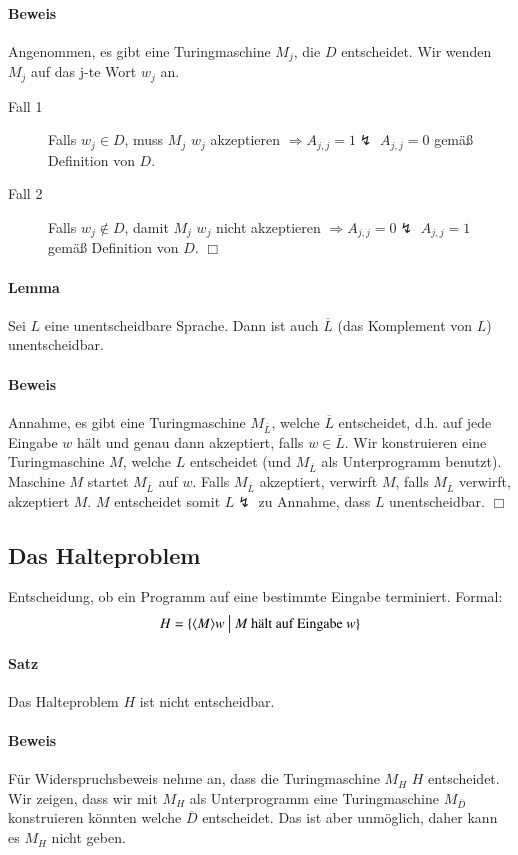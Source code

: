 \paragraph*{Beweis} Angenommen, es gibt eine Turingmaschine $M_j$, die $D$ entscheidet. Wir wenden $M_j$ auf das j-te Wort $w_j$ an.
\begin{description}
	\item[Fall 1] Falls $w_j \in D$, muss $M_j$ $w_j$ akzeptieren $\Rightarrow A_{j,j}=1 \lightning$ $A_{j,j}=0$ gemäß Definition von $D$.
	\item[Fall 2] Falls $w_j \not\in D$, damit $M_j$ $w_j$ nicht akzeptieren $\Rightarrow A_{j,j}=0 \lightning$ $A_{j,j}=1$ gemäß Definition von $D$. $\Box$
\end{description}

\paragraph*{Lemma} Sei $L$ eine unentscheidbare Sprache. Dann ist auch $\overline{L}$ (das Komplement von $L$) unentscheidbar.

\paragraph*{Beweis} Annahme, es gibt eine Turingmaschine $M_{\overline{L}}$, welche $\overline{L}$ entscheidet, d.h. auf jede Eingabe $w$ hält und genau dann akzeptiert, falls $w \in \overline{L}$. Wir konstruieren eine Turingmaschine $M$, welche $L$ entscheidet (und $M_{\overline{L}}$ als Unterprogramm benutzt). Maschine $M$ startet $M_{\overline{L}}$ auf $w$. Falls $M_{\overline{L}}$ akzeptiert, verwirft $M$, falls $M_{\overline{L}}$ verwirft, akzeptiert $M$. $M$ entscheidet somit $L \lightning$ zu Annahme, dass $L$ unentscheidbar. $\Box$


\subsection{Das Halteproblem}
Entscheidung, ob ein Programm auf eine bestimmte Eingabe terminiert. Formal: $$ H=\{\langle M \rangle w \ \big|\  M \text{ hält auf Eingabe } w \} $$

\paragraph*{Satz} Das Halteproblem $H$ ist nicht entscheidbar.

\paragraph*{Beweis} Für Widerspruchsbeweis nehme an, dass die Turingmaschine $M_H$ $H$ entscheidet. Wir zeigen, dass wir mit $M_H$ als Unterprogramm eine Turingmaschine $M_{\overline{D}}$ konstruieren könnten welche $\overline{D}$ entscheidet. Das ist aber unmöglich, daher kann es $M_H$ nicht geben.

